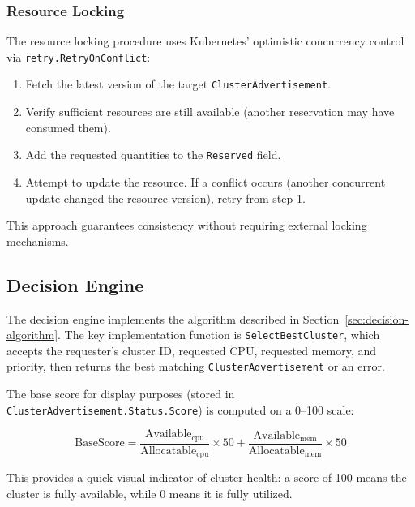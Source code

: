 \subsubsection{Resource Locking}

The resource locking procedure uses Kubernetes' optimistic concurrency control via \texttt{retry.RetryOnConflict}:

\begin{enumerate}
    \item Fetch the latest version of the target \texttt{ClusterAdvertisement}.
    \item Verify sufficient resources are still available (another reservation may have consumed them).
    \item Add the requested quantities to the \texttt{Reserved} field.
    \item Attempt to update the resource. If a conflict occurs (another concurrent update changed the resource version), retry from step 1.
\end{enumerate}

This approach guarantees consistency without requiring external locking mechanisms.

\subsection{Decision Engine}
\label{subsec:decision-engine}

The decision engine implements the algorithm described in Section~\ref{sec:decision-algorithm}. The key implementation function is \texttt{SelectBestCluster}, which accepts the requester's cluster ID, requested CPU, requested memory, and priority, then returns the best matching \texttt{ClusterAdvertisement} or an error.

The base score for display purposes (stored in \texttt{ClusterAdvertisement.Status.Score}) is computed on a 0--100 scale:

\begin{equation}
\text{BaseScore} = \frac{\text{Available}_{\text{cpu}}}{\text{Allocatable}_{\text{cpu}}} \times 50 + \frac{\text{Available}_{\text{mem}}}{\text{Allocatable}_{\text{mem}}} \times 50
\end{equation}

This provides a quick visual indicator of cluster health: a score of 100 means the cluster is fully available, while 0 means it is fully utilized.


